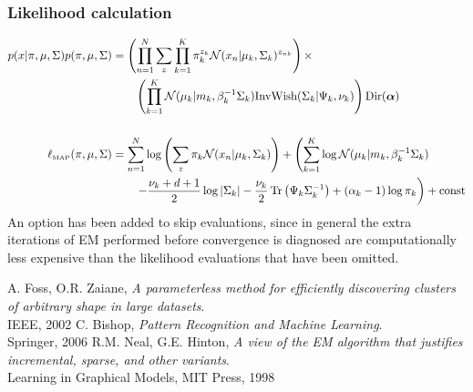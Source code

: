 \documentclass[11pt]{article}
\DeclareMathOperator{\Trace}{Tr}
\def\bs{\boldsymbol}
\begin{document}
\subsubsection{Likelihood calculation}
\begin{align*}
p(x|\pi, \mu, \Sigma)p(\pi, \mu, \Sigma) &= \left( \prod_{n=1}^N \sum_z \prod_{k=1}^K \pi_k^{z_k} \mathcal{N}(x_n|\mu_k, \Sigma_k)^{z_{nk}}\right) \times\\
&\qquad \left(\prod_{k=1}^K \mathcal{N}(\mu_k|m_k, \beta_k^{-1} \Sigma_k)\text{InvWish}(\Sigma_k|\Psi_k, \nu_k)\right)  \text{Dir}(\bs{\alpha})\\[15pt]
\ell_{\text{\tiny{MAP}}}(\pi, \mu, \Sigma) & = \sum_{n=1}^N \log\left(\sum_z \pi_k \mathcal{N}(x_n|\mu_k, \Sigma_k)\right) + \left( \sum_{k=1}^K \log\mathcal{N}(\mu_k|m_k, \beta_k^{-1} \Sigma_k)\right.\\
& \qquad \left. -\frac{\nu_k + d+ 1}{2}\log|\Sigma_k| - \frac{\nu_k}{2}\Trace\left(\Psi_k\Sigma_k^{-1}\right) + (\alpha_k-1)\log\pi_k  \right) + \text{const}
\end{align*}
An option has been added to skip evaluations, since in general the extra iterations of EM performed before convergence is diagnosed are computationally less expensive than the likelihood evaluations that have been omitted.
\begin{thebibliography}{1}
{A. Foss, O.R. Zaiane,
\emph{A parameterless method for efficiently discovering clusters of arbitrary shape in large datasets}.\\
IEEE, 2002}
 {C. Bishop,
  \emph{Pattern Recognition and Machine Learning}.\\
  Springer, 2006}
 {R.M. Neal, G.E. Hinton,
  \emph{A view of the EM algorithm that justifies incremental, sparse, and other variants}.\\
  Learning in Graphical Models, MIT Press, 1998}
\end{thebibliography}
\end{document}
